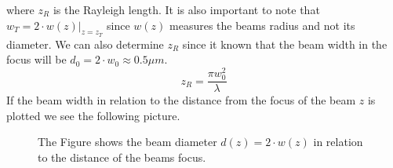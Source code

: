 where $z_{\si{R}}$ is the Rayleigh length. It is also important to note that $w_{\si{T}}=2\cdot w(z)|_{z=z_{\si{T}}}$ since $w(z)$ measures the beams radius and not its diameter. We can also determine $z_{\si{R}}$ since it known that the beam width in the focus will be $d_0=2\cdot w_0 \approx 0.5 \si{\mu m}$.
\begin{equation}
	z_{\si{R}}=\frac{\pi w_0^2}{\lambda}
\end{equation}
If the beam width in relation to the distance from the focus of the beam $z$ is plotted we see the following picture.
\begin{figure}[H]
	
	\caption{The Figure shows the beam diameter $d(z)=2\cdot w(z)$ in relation to the distance of the beams focus.}
\end{figure}
